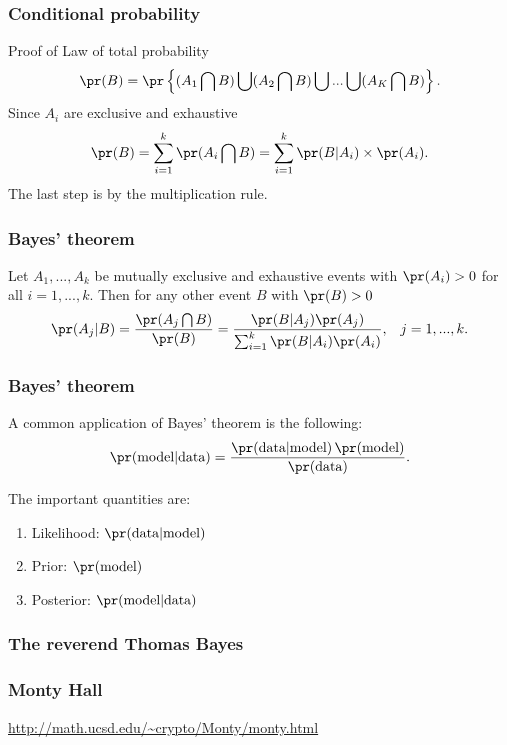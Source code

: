 \begin{frame}[fragile]\frametitle{Conditional probability}

Proof of Law of total probability \\ 

$$\pr(B) = \pr \left\{(A_1 \bigcap B) \bigcup (A_2 \bigcap B) \bigcup
    ... \bigcup (A_K \bigcap B)\right\}.$$ 
Since $A_i$ are exclusive and exhaustive
$$\pr(B) = \sum_{i=1}^k \pr(A_i \bigcap B) = \sum_{i=1}^k \pr(B |A_i)
\times \pr(A_i) .$$
The last step is by the multiplication rule.
\end{frame}

\begin{frame}[fragile]\frametitle{Bayes' theorem}

\begin{thm}
Let $A_1,...,A_k$ be mutually exclusive and exhaustive events with 
$\pr(A_i) > 0$ for all $i=1,...,k$. Then
for any other event $B$ with $\pr(B) > 0$
$$\pr(A_j|B) = \frac{\pr(A_j \bigcap B)}{\pr(B)} = \frac{\pr(B|A_j)
  \pr(A_j)}{\sum_{i=1}^k \pr(B|A_i) \pr(A_i)}, \, \, \, \, \, j=1,...,k.
$$
\end{thm}

\end{frame}


\begin{frame}[fragile]\frametitle{Bayes' theorem}

A common application of Bayes' theorem is the following:
$$\pr(\mbox{model}|\mbox{data}) = \frac{\pr(\mbox{data}|\mbox{model})
  \, \pr(\mbox{model})}{\pr(\mbox{data})}.$$ 
 
The important quantities are:
\begin{enumerate}
\item Likelihood: $\pr(\mbox{data}|\mbox{model})$ 
\item Prior: $\pr(\mbox{model})$ 
\item Posterior: $\pr(\mbox{model}|\mbox{data})$ 
\end{enumerate}
\end{frame}


\begin{frame}[fragile]\frametitle{The reverend Thomas Bayes}
\end{frame}

\begin{frame}[fragile]\frametitle{Monty Hall}
\alert{\url{http://math.ucsd.edu/~crypto/Monty/monty.html}}
\end{frame}


